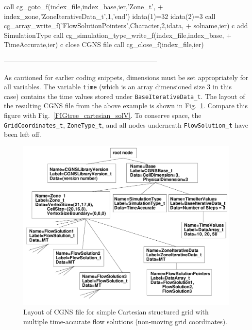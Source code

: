 \documentclass[12pt]{article}
\begin{document}
{\newline\indent      call cg\_goto\_f(index\_file,index\_base,ier,'Zone\_t',
\newline + \indent index\_zone,'ZoneIterativeData\_t',1,'end')
\newline\indent      idata(1)=32
\newline\indent      idata(2)=3
\newline\indent      call cg\_array\_write\_f('FlowSolutionPointers',Character,2,idata,
\newline + \indent    solname,ier)
\newline c   add SimulationType
\newline\indent      call cg\_simulation\_type\_write\_f(index\_file,index\_base,
\newline + \indent TimeAccurate,ier)
\newline c   close CGNS file
\newline\indent      call cg\_close\_f(index\_file,ier)
}

--------------------------------------------------------------------

As cautioned for earlier coding snippets, dimensions must be set appropriately
for all variables.  The variable {\tt time} (which is an array dimensioned size 3 in this case)
contains the time values stored under {\tt BaseIterativeData\_t}.
The layout of the resulting CGNS file
from the above example is shown in Fig.~\ref{FIGtree_cartesian_soltime}.
Compare this figure with Fig.~\ref{FIGtree_cartesian_solV}.  To
conserve space, the {\tt GridCoordinates\_t}, {\tt ZoneType\_t}, and
all nodes underneath {\tt FlowSolution\_t} have been left off.

\begin{figure}[hpbt]
\centerline{{\includegraphics[width=150mm]{figures/tree_cartesian_soltime}}}
\caption{Layout of CGNS file for simple Cartesian
structured grid with multiple time-accurate flow solutions
(non-moving grid coordinates).}
\label{FIGtree_cartesian_soltime}
\end{figure}
%
\end{document}
